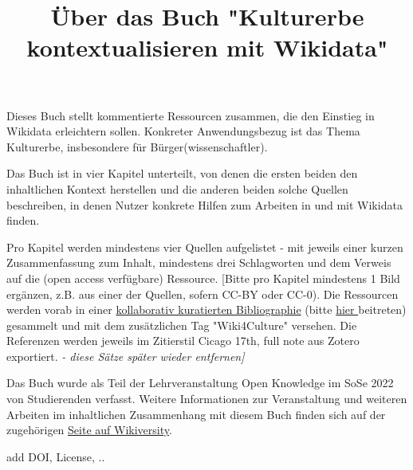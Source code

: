 \documentclass{article}
\begin{document}
\title{Über das Buch "Kulturerbe kontextualisieren mit Wikidata"}

\maketitle





Dieses Buch stellt kommentierte Ressourcen zusammen, die den Einstieg in Wikidata erleichtern sollen. Konkreter Anwendungsbezug ist das Thema Kulturerbe, insbesondere für Bürger(wissenschaftler). 


Das Buch ist in vier Kapitel unterteilt, von denen die ersten beiden den inhaltlichen Kontext herstellen und die anderen beiden solche Quellen beschreiben, in denen Nutzer konkrete Hilfen zum Arbeiten in und mit Wikidata finden.


Pro Kapitel werden mindestens vier Quellen aufgelistet - mit jeweils einer kurzen Zusammenfassung zum Inhalt, mindestens drei Schlagworten und dem Verweis auf die (open access verfügbare) Ressource. [Bitte pro Kapitel mindestens 1 Bild ergänzen, z.B. aus einer der Quellen, sofern CC-BY oder CC-0). Die Ressourcen werden vorab in einer \href{https://www.zotero.org/groups/1838445/generation_r/collections/DND4FSHT}{kollaborativ kuratierten Bibliographie} (bitte \href{https://www.zotero.org/groups/1838445/generation_r}{hier }beitreten) gesammelt und mit dem zusätzlichen Tag "Wiki4Culture" versehen. Die Referenzen werden jeweils im Zitierstil Cicago 17th, full note aus Zotero exportiert.\emph{ - diese Sätze später wieder entfernen]}


Das Buch wurde als Teil der Lehrveranstaltung Open Knowledge im SoSe 2022 von Studierenden verfasst. Weitere Informationen zur Veranstaltung und weiteren Arbeiten im inhaltlichen Zusammenhang mit diesem Buch finden sich auf der zugehörigen \href{https://de.wikiversity.org/wiki/OpenKnowledge22}{Seite auf Wikiversity}.


add DOI, License, ..
\end{document}
